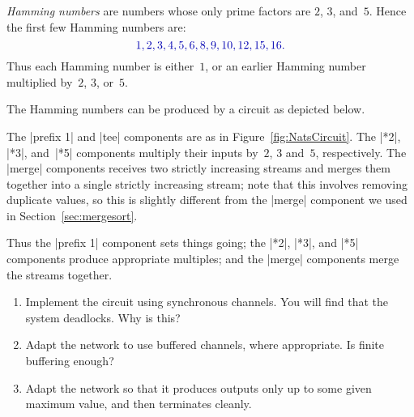 \begin{question}
\emph{Hamming numbers} are numbers whose only prime factors are $2$, $3$,
and~$5$.  Hence the first few Hamming numbers are:
\[ \mstyle
1, 2, 3, 4, 5, 6, 8, 9, 10, 12, 15, 16.
\]
Thus each Hamming number is either~$1$, or an earlier Hamming number
multiplied by~$2$, $3$, or~$5$.

The Hamming numbers can be produced by a circuit as depicted below.
%
\begin{center}
\end{center}
%
The |prefix 1| and |tee| components are as in Figure~\ref{fig:NatsCircuit}.
The |*2|, |*3|, and~|*5| components multiply their inputs by~$2$, $3$ and~$5$,
respectively.  The |merge| components receives two strictly increasing streams
and merges them together into a single strictly increasing stream; note that
this involves removing duplicate values, so this is slightly different from
the |merge| component we used in Section~\ref{sec:mergesort}.

Thus the |prefix 1| component sets things going; the |*2|, |*3|, and |*5|
components produce appropriate multiples; and the |merge| components merge the
streams together.

\begin{enumerate}
\item Implement the circuit using synchronous channels.  You will find that
  the system deadlocks.  Why is this?

\item Adapt the network to use buffered channels, where appropriate.  Is finite
  buffering enough?

\item Adapt the network so that it produces outputs only up to some given
  maximum value, and then terminates cleanly.
\end{enumerate}
\end{question}

